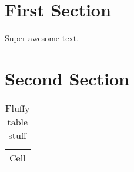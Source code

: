 \documentclass{article}
\begin{document}
\section{First Section} %
\label{sec:first_section}

Super awesome text.


\section{Second Section} %
\label{sec:second_section}


\begin{table}[htbp]
    \caption{Fluffy table stuff}
    \begin{center}
        \begin{tabular}{c}
            Cell
        \end{tabular}
    \end{center}
    \label{table:a_table_label}
\end{table}
\end{document}
